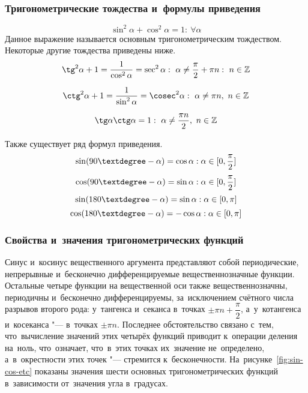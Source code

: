 \documentclass[]{scrartcl}
\begin{document}
\subsubsection{Тригонометрические тождества и~формулы приведения}
\begin{equation}\label{eq:trigon-identity-1}
\sin^2 \alpha + \cos^2 \alpha =1:\ \forall \alpha
\end{equation}
Данное выражение называется основным тригонометрическим тождеством.
Некоторые другие тождества приведены ниже.
\begin{equation}\label{eq:trigon-identity-2}
\tg^2 \alpha +1 = \frac{1}{\cos^2 \alpha} = \sec^2 \alpha:\ \alpha \neq \frac{\pi}{2} + \pi n:\ n \in \mathbb{Z}
\end{equation}

\begin{equation}\label{eq:trigon-identity-3}
\ctg^2 \alpha + 1 = \frac{1}{\sin^2 \alpha} = \cosec^2 \alpha:\ \alpha \neq \pi n,\ n \in \mathbb{Z}
\end{equation}

\begin{equation}\label{eq:trigon-identity-4}
\tg \alpha \ctg \alpha = 1:\ \alpha \neq \frac{\pi n}{2},\ n \in \mathbb{Z}
\end{equation}

Также существует ряд формул приведения.
\begin{equation}\label{eq:trigon-identity-5}
\sin (90\textdegree-\alpha)=\cos \alpha: \alpha \in [0,\frac{\pi}{2}]
\end{equation}
\begin{equation}\label{eq:trigon-identity-6}
\cos (90\textdegree-\alpha)=\sin \alpha: \alpha \in [0,\frac{\pi}{2}]
\end{equation}
\begin{equation}\label{eq:trigon-identity-7}
\sin (180\textdegree-\alpha)=\sin \alpha: \alpha \in [0,\pi]
\end{equation}
\begin{equation}\label{eq:trigon-identity-8}
\cos (180\textdegree-\alpha)=-\cos \alpha: \alpha \in [0,\pi]
\end{equation}

\subsubsection{Свойства и~значения тригонометрических функций}
Синус и~косинус вещественного аргумента представляют собой периодические, непрерывные и~бесконечно дифференцируемые вещественнозначные функции. Остальные четыре функции на вещественной оси также вещественнозначны, периодичны и~бесконечно дифференцируемы, за~исключением счётного числа разрывов второго рода: у~тангенса и~секанса в~точках  $\textstyle \pm \pi n+ \dfrac{\pi}{2}$, а~у~котангенса и~косеканса "--- в~точках $\textstyle \pm \pi n$. Последнее обстоятельство связано с~тем, что~вычисление значений этих четырёх функций приводит к~операции деления на~ноль, что~означает, что~в~этих точках их~значение не~определено, а~в~окрестности этих точек "--- стремится к~бесконечности. На~рисунке~\ref{fig:sin-cos-etc} показаны значения шести основных тригонометрических функций в~зависимости от~значения угла в~градусах.
\end{document}
